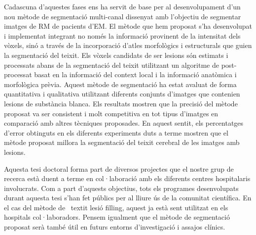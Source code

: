 Cadascuna d'aquestes fases ens ha servit de base per al desenvolupament d'un nou mètode de segmentació multi-canal dissenyat amb l'objectiu de segmentar imatges de RM de pacients d'EM. El mètode que hem proposat s'ha desenvolupat i implementat integrant no només la informació provinent de la intensitat dels vòxels, sinó a través de la incorporació d'atles morfològics i estructurals que guien la segmentació del teixit. Els vòxels candidats de ser lesions són estimats i processats abans de la segmentació del teixit utilitzant un algoritme de post-processat basat en la informació del context local i la informació anatòmica i morfològica prèvia. Aquest mètode de segmentació ha estat avaluat de forma quantitativa i qualitativa utilitzant diferents conjunts d'imatges que contenien lesions de substància blanca. Els resultats mostren que la precisió del mètode proposat va ser consistent i molt competitiva en tot tipus d'imatges en comparació amb altres tècniques proposades. En aquest sentit, els percentatges d'error obtinguts en els diferents experiments duts a terme mostren que el mètode proposat millora la segmentació del teixit cerebral de les imatges amb lesions.

Aquesta tesi doctoral forma part de diversos projectes que el nostre grup de recerca està duent a terme en col·laboració amb els diferents centres hospitalaris involucrats. Com a part d'aquests objectius, tots els programes desenvolupats durant aquesta tesi s'han fet públics per al lliure ús de la comunitat científica. En el cas del mètode de \ textit {lesió filling}, aquest ja està sent utilitzat en els hospitals col·laboradors. Pensem igualment que el mètode de segmentació proposat serà també útil en futurs entorns d'investigació i assajos clínics.
